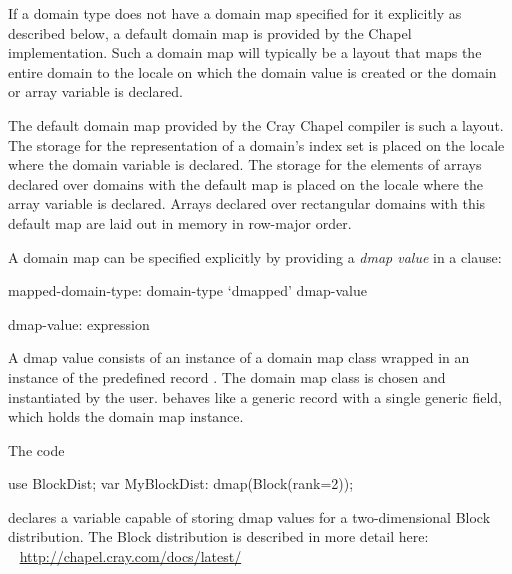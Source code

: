 If a domain type does not have a domain map specified for it
explicitly as described below,
a default domain map is provided by the Chapel implementation.
Such a domain map will typically be a layout that maps the entire domain
to the locale on which the domain value is created or
the domain or array variable is declared.

\begin{craychapel}
The default domain map provided by the Cray Chapel compiler
is such a layout. The storage for the representation of a domain's
index set is placed on the locale where the domain variable is declared.
The storage for the elements of arrays declared over domains with
the default map is placed on the locale where the array variable
is declared.
Arrays declared over rectangular domains with this default map
are laid out in memory in row-major order.
\end{craychapel}

A domain map can be specified explicitly by
providing a \emph{dmap value} in a  clause:

\begin{syntax}
mapped-domain-type:
  domain-type `dmapped' dmap-value

dmap-value:
  expression
\end{syntax}

A dmap value consists of an instance of a domain map class
wrapped in an instance of the predefined record .
The domain map class is chosen and instantiated by the user.
 behaves like a generic record with a single generic field,
which holds the domain map instance.

\begin{example}
The code
\begin{chapel}
use BlockDist;
var MyBlockDist: dmap(Block(rank=2));
\end{chapel}
declares a variable capable of storing dmap values
for a two-dimensional Block distribution.
The Block distribution is described in more detail here:
\\ %
\mbox{$$ $$ $$} %
\url{http://chapel.cray.com/docs/latest/}
\end{example}

